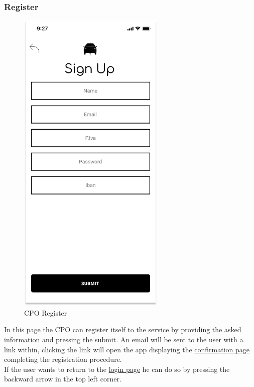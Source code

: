 \subsubsection{Register}
\begin{figure}[H]
    \centering
    \includegraphics[keepaspectratio, height=15cm]{Mockup/CPOAppInterface/Register.png}
    \caption{\ac{CPO} Register}
    \label{site:Register}
\end{figure}
In this page the \ac{CPO} can register itself to the service by providing the asked information and pressing the submit. An email will be sent to the user with a link within, clicking the link will open the app displaying the \hyperref[site:ConfirmReg]{confirmation page} completing the registration procedure.\\
If the user wants to return to the \hyperref[fig:Login]{login page} he can do so by pressing the backward arrow in the top left corner.\\
